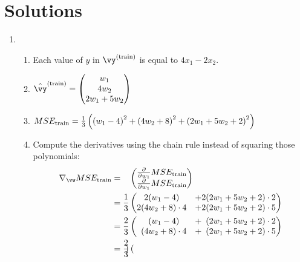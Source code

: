 \documentclass{article}
\newcommand{\utrain}{^{\textnormal{(train)}}}
\newcommand{\strain}{_{\textnormal{train}}}
\begin{document}
\section*{Solutions}
\begin{enumerate}

\item
    \begin{enumerate}
    \item Each value of $y$ in $\vy\utrain$ is equal to $4x_1 - 2x_2$.
    \item $\hat{\vy}\utrain = \begin{pmatrix} w_1\\ 4w_2 \\ 2w_1 + 5w_2 \end{pmatrix}$
    \item $MSE\strain = \frac13\left(\left(w_1-4\right)^2 + \left(4w_2+8\right)^2+\left(2w_1+5w_2+2\right)^2\right)$ 
    \item Compute the derivatives using the chain rule instead of squaring those polynomials:
    \begin{align*} \nabla_\vw MSE\strain & = \phantom{\frac13} \begin{pmatrix}
                                            \frac{\partial}{\partial w_1}MSE\strain   \\ 
                                            \frac{\partial}{\partial w_1}MSE\strain
                                            \end{pmatrix} \\
                              & = \frac13 \begin{pmatrix}
                                            2(w_1-4)        & + 2(2w_1+5w_2+2)\cdot 2 \\ 
                                            2(4w_2+8)\cdot4 & + 2(2w_1+5w_2+2)\cdot 5
                                            \end{pmatrix} \\
                              & = \frac23 \begin{pmatrix}
                                            \phantom2(w_1-4)         & + \phantom2(2w_1+5w_2+2)\cdot 2  \\ 
                                            \phantom2(4w_2+8)\cdot4  & + \phantom2(2w_1+5w_2+2)\cdot 5
                                            \end{pmatrix} \\
                              & = \frac23 \begin{pmatrix}

\end{pmatrix}
\end{align*}
\end{enumerate}
\end{enumerate}
\end{document}
